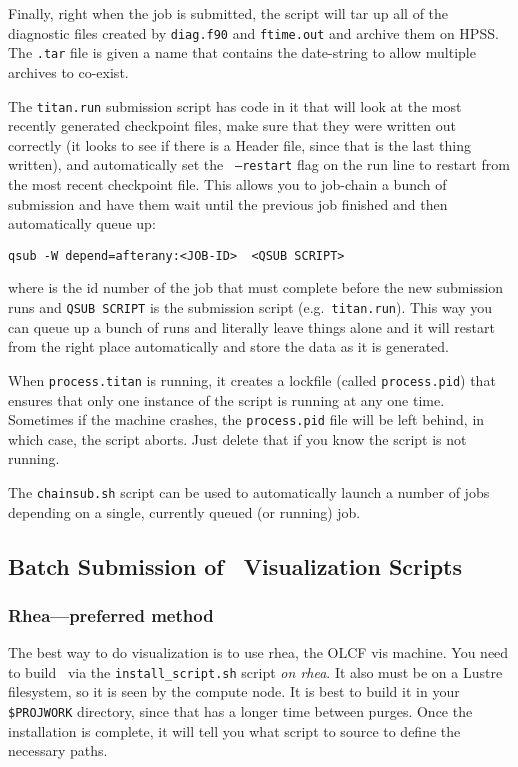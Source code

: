 Finally, right when the job is submitted, the script will tar up all
of the diagnostic files created by {\tt diag.f90} and {\tt ftime.out}
and archive them on HPSS.  The {\tt .tar} file is given a name that
contains the date-string to allow multiple archives to co-exist.

The {\tt titan.run} submission script has code in it that will look at
the most recently generated checkpoint files, make sure that they were
written out correctly (it looks to see if there is a Header file,
since that is the last thing written), and automatically set the {\tt
--restart} flag on the run line to restart from the most recent
checkpoint file.  This allows you to job-chain a bunch of submission
and have them wait until the previous job finished and then
automatically queue up:
\begin{verbatim}
qsub -W depend=afterany:<JOB-ID>  <QSUB SCRIPT>
\end{verbatim}
where {\tt <JOB-ID>} is the id number of the job that must complete
before the new submission runs and {\tt QSUB SCRIPT} is the submission
script (e.g.\ {\tt titan.run}).  This way you can queue up a bunch of
runs and literally leave things alone and it will restart from the
right place automatically and store the data as it is generated.

When {\tt process.titan} is running, it creates a lockfile (called
{\tt process.pid}) that ensures that only one instance of the script
is running at any one time.  Sometimes if the machine crashes, the
{\tt process.pid} file will be left behind, in which case, the script
aborts.  Just delete that if you know the script is not running.

The {\tt chainsub.sh} script can be used to automatically launch a
number of jobs depending on a single, currently queued (or running)
job.


\subsection{Batch Submission of \yt\ Visualization Scripts}

\subsubsection{Rhea---preferred method}

The best way to do visualization is to use rhea, the OLCF vis machine.
You need to build \yt\ via the {\tt install\_script.sh} script {\em on
rhea}.  It also must be on a Lustre filesystem, so it is seen by
the compute node.  It is best to build it in your {\tt \$PROJWORK} directory,
since that has a longer time between purges.  Once the installation is
complete, it will tell you what script to source to define the
necessary paths.

